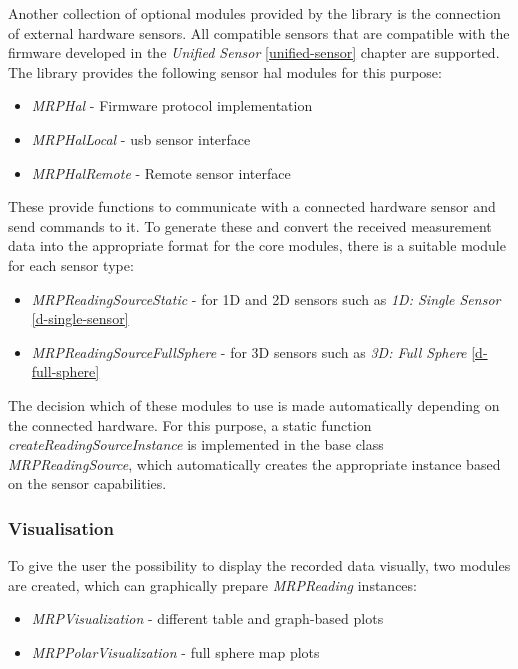 Another collection of optional modules provided by the library is the
connection of external hardware sensors. All compatible sensors that are
compatible with the firmware developed in the \emph{Unified Sensor}
\ref{unified-sensor} chapter are supported. The library provides the
following sensor \gls{hal} modules for this purpose:

\newpage

\begin{itemize}
\tightlist
\item
  \emph{MRPHal} - Firmware protocol implementation
\item
  \emph{MRPHalLocal} - \gls{usb} sensor interface
\item
  \emph{MRPHalRemote} - Remote sensor interface
\end{itemize}

These provide functions to communicate with a connected hardware sensor
and send commands to it. To generate these and convert the received
measurement data into the appropriate format for the core modules, there
is a suitable module for each sensor type:

\begin{itemize}
\tightlist
\item
  \emph{MRPReadingSourceStatic} - for 1D and 2D sensors such as
  \emph{1D: Single Sensor} \ref{d-single-sensor}
\item
  \emph{MRPReadingSourceFullSphere} - for 3D sensors such as \emph{3D:
  Full Sphere} \ref{d-full-sphere}
\end{itemize}

The decision which of these modules to use is made automatically
depending on the connected hardware. For this purpose, a static function
\emph{createReadingSourceInstance} is implemented in the base class
\emph{MRPReadingSource}, which automatically creates the appropriate
instance based on the sensor capabilities.

\hypertarget{visualisation}{%
\subsubsection{Visualisation}\label{visualisation}}

To give the user the possibility to display the recorded data visually,
two modules are created, which can graphically prepare \emph{MRPReading}
instances:

\begin{itemize}
\tightlist
\item
  \emph{MRPVisualization} - different table and graph-based plots
\item
  \emph{MRPPolarVisualization} - full sphere map plots
\end{itemize}

